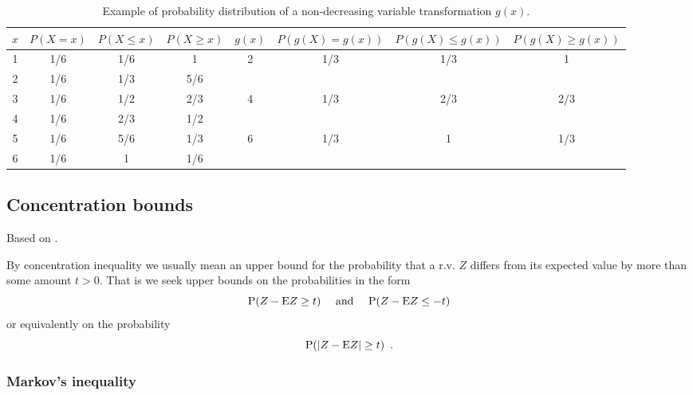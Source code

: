 \begin{table}[h!]
\caption{Example of probability distribution of a non-decreasing variable transformation $g(x)$.}
\label{tab:VarTransform}
\vskip 0.15in
\begin{center}
\begin{tabular}{cccc | cccc}
\hline
$x$ & $P(X=x)$  & $P(X \leq x)$ & $P(X \geq x)$ & $g(x)$ & $P(g(X)=g(x))$ & $P(g(X) \leq g(x))$ & $P(g(X) \geq g(x))$ \\
\hline
1    & 1/6 & 1/6 & 1 &\multirow{2}{*}{2} & \multirow{2}{*}{1/3} & \multirow{2}{*}{1/3} & \multirow{2}{*}{1}\\
2    & 1/6 & 1/3 & 5/6 \\
\hline
3    & 1/6 & 1/2 & 2/3 &\multirow{2}{*}{4} & \multirow{2}{*}{1/3} & \multirow{2}{*}{2/3} & \multirow{2}{*}{2/3}\\
4    & 1/6 & 2/3 & 1/2 \\
\hline
5    & 1/6 & 5/6 & 1/3 &\multirow{2}{*}{6} & \multirow{2}{*}{1/3} & \multirow{2}{*}{1} & \multirow{2}{*}{1/3}\\
6    & 1/6 & 1 & 1/6 \\
\hline
\end{tabular}
\end{center}
\end{table}





\subsection{Concentration bounds}\label{sec:concentrationBounds}

Based on \cite{Boucheron2013}.

By concentration inequality we usually mean an upper bound for the probability that a r.v. $Z$ differs from its expected value by more than some amount $t > 0$. That is we seek upper bounds on the probabilities in the form
\begin{equation}
\mathrm{P}{(Z-\mathrm{E}{Z} \geq t)} \quad \text{ and } \quad \mathrm{P}{(Z-\mathrm{E}{Z} \leq -t)}
\end{equation}
or equivalently on the probability
\begin{equation}
\mathrm{P}{(|Z-\mathrm{E}{Z}| \geq t)} \enspace .
\end{equation}

\subsubsection{Markov's inequality}

